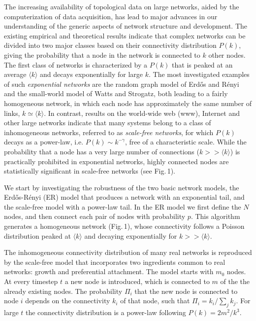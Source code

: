 The increasing availability of topological data on large networks, aided by the computerization of data acquisition, has lead to major advances in our understanding of the generic aspects of network structure and development\cite{random,random1,small_world,comp,eco,banavar,banavar1,amaral}. The  existing empirical and theoretical results indicate that complex networks can be divided into two major classes based on their connectivity distribution $P(k)$, giving the probability that a node in the network is connected to $k$ other nodes. The first class of networks is characterized by a $P(k)$ that is peaked at an average $\langle k\rangle$ and decays exponentially for large $k$. The most investigated examples of such {\it exponential networks} are the random graph model of Erd\H{o}s and R\'enyi\cite{random,random1} and the small-world model of Watts and Strogatz\cite{small_world}, both leading to a fairly homogeneous network, in which each node has approximately the same number of links, $k\simeq\langle k\rangle$. In contrast, results on the world-wide web (www)\cite{diam,ibm,hubermann}, Internet\cite{faloutsos} and other large networks\cite{ba,physica,redner} indicate that many systems belong to a class of inhomogeneous networks, referred to as {\it scale-free networks}, for which $P(k)$ decays as a power-law, i.e. $P(k)\sim k^{-\gamma}$, free of a characteristic scale. While the probability that a node has a very large number of connections ($k>>\langle k \rangle$) is practically prohibited in exponential networks, highly connected nodes are statistically significant in scale-free networks (see Fig.$\,$1).

We start by investigating the robustness of the two basic network models, the Erd\H{o}s-R\'enyi (ER) model\cite{random,random1} that produces a network with an exponential tail, and the scale-free model\cite{ba} with a power-law tail. In the ER model we first define the $N$ nodes, and then connect each pair of nodes with probability $p$. This algorithm generates a homogeneous network (Fig.$\,$1), whose connectivity follows a Poisson distribution  peaked at $\langle k\rangle$ and decaying exponentially for $k>>\langle k\rangle$. 

The inhomogeneous connectivity distribution of many real networks is reproduced by the scale-free model\cite{ba,physica} that incorporates two ingredients common to real networks: growth and preferential attachment. The model starts with $m_0$ nodes. At every timestep $t$ a new node is introduced, which is connected to $m$ of the the already existing nodes. The probability $\Pi_i$ that the new node is connected to node $i$ depends on the connectivity $k_i$ of that node, such that $\Pi_i=k_i/ \sum_j k_j$. For large $t$ the connectivity distribution is a power-law following $P(k)=2m^2/k^3$.

